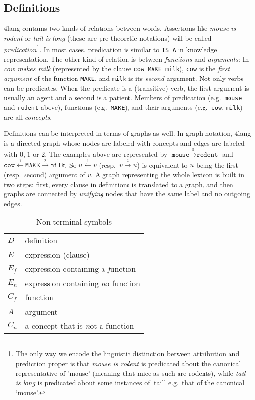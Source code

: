 \documentclass[a4paper,10pt]{article}
\begin{document}
\subsection{Definitions}
4lang contains two kinds of relations between words. Assertions like
\emph{mouse is rodent} or \emph{tail is long} (these are pre-theoretic
notations) will be called \emph{predication}\footnote{The only way we encode
the linguistic distinction between attribution and prediction proper is that
\emph{mouse is rodent} is predicated about the canonical representative of
`mouse' (meaning that mice as such are rodents), while \emph{tail is long} is
predicated about some instances of `tail' e.g.\ that of the canonical
`mouse'.}. In most cases, predication is similar to \texttt{IS\_A} in
knowledge representation. The other kind of relation is between
\emph{functions} and \emph{arguments}: In \emph{cow makes milk} (represented
by the clause \texttt{cow MAKE milk}), \texttt{cow} is the \emph{first
argument} of the function \texttt{MAKE}, and \texttt{milk} is its
\emph{second} argument. Not only verbs can be predicates. When the predicate
is a (transitive) verb, the first argument is usually an agent and a second is
a patient. Members of predication (e.g.\ \texttt{mouse} and \texttt{rodent}
above), functions (e.g.\ \texttt{MAKE}), and their arguments (e.g.\
\texttt{cow}, \texttt{milk}) are all \emph{concepts}.

Definitions can be interpreted in terms of graphs as well. In graph notation,
4lang is a directed graph whose nodes are labeled with concepts and edges are
labeled with $0$, $1$ or $2$. The examples above are represented by
$\texttt{mouse}\xrightarrow{0}\texttt{rodent}$ and
$\texttt{cow}\xleftarrow{1}\texttt{MAKE}\xrightarrow{2}\texttt{milk}$. So
$u\xleftarrow{1}v$ (resp.\ $v\xrightarrow 2 u$) is equivalent to $u$ being the
first (resp.\ second) argument of $v$.
A graph representing the whole lexicon is built in two steps: first, every
clause in definitions is translated to a graph, and then graphs are connected
by \emph{unifying} nodes that have the same label and no outgoing edges.


\begin{table}[h]
\begin{center}
\begin{tabular}{ll}
 $D$ & definition
\\ $ E $ & expression (clause)
\\ $ E_f $ & expression containing a \emph function
\\ $ E_n  $ & expression containing \emph no function
\\ $ C_f $ & function
\\ $ A $ & argument 
\\ $ C_n $ & a concept that is \emph not a function
\end{tabular}
\end{center}
\caption{Non-terminal symbols}
\label{table_nont}
\end{table}
\end{document}
